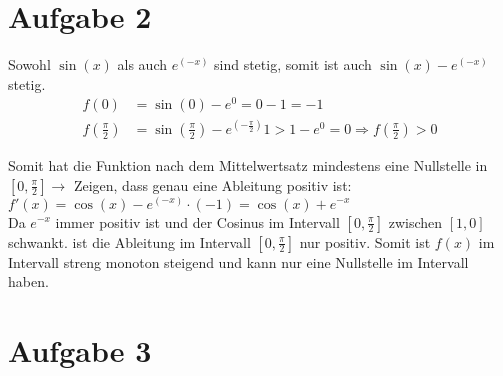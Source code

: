 \documentclass[11pt,a4paper]{article}
\begin{document}
  \section*{Aufgabe 2}

    Sowohl $\sin(x)$ als auch $e^{(-x)}$ sind stetig, somit ist auch $\sin(x)-e^{(-x)}$ stetig.\\

    \begin{align*}
      f(0) &= \sin(0) - e^{0} = 0 - 1 = -1 \\
      f\left(\frac{\pi}{2}\right) &= \sin\left(\frac{\pi}{2}\right) - e^{\left(-\frac{\pi}{2}\right)} 1 > 1 - e^0 = 0 \Rightarrow f\left(\frac{\pi}{2}\right) > 0
    \end{align*}

    Somit hat die Funktion nach dem Mittelwertsatz mindestens eine Nullstelle in $\left[ 0 , \frac{\pi}{2} \right] \to $ Zeigen, dass genau eine Ableitung positiv ist:\\

    $f'(x) = \cos(x) - e^{(-x)} \cdot (- 1) = \cos(x) + e^{-x}$\\

    Da $e^{-x}$ immer positiv ist und der Cosinus im Intervall $\left[ 0 , \frac{\pi}{2} \right]$ zwischen $\left[ 1,0 \right]$ schwankt. ist die Ableitung im Intervall $\left[ 0 , \frac{\pi}{2} \right]$ nur positiv. Somit ist $f(x)$ im Intervall streng monoton steigend und kann nur eine Nullstelle im Intervall haben.

  \section*{Aufgabe 3}
\end{document}
